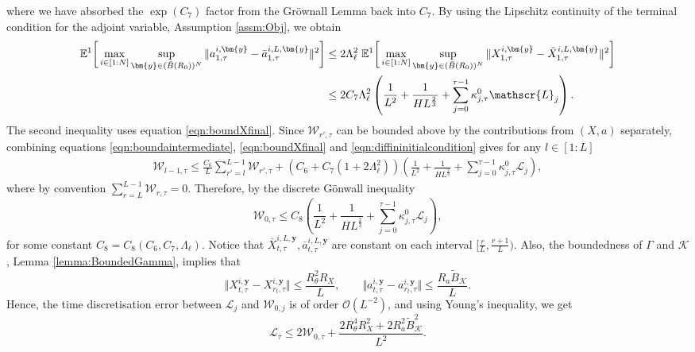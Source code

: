 \documentclass{article}
\begin{document}
\begin{appendices}
\begin{equation}
\end{equation}
where we have absorbed the $\exp(C_7)$ factor from the Gr\"ownall Lemma back into $C_7$. By using the Lipschitz continuity of the terminal condition for the adjoint variable, Assumption \ref{assm:Obj}, we obtain
\begin{align}\label{eqn:diffininitialcondition}
\mathbb E^1 \bigg[\max_{i\in[1:N]}\sup_{\bm{y}\in (\bar B(R_0))^N} \Vert a^{i,\bm{y}}_{1,\tau} - \bar a^{i,L,\bm{y}}_{1,\tau}\Vert^2 \bigg] &\le 2\Lambda_\ell^2\;\mathbb E^1 \bigg[\max_{i\in[1:N]} \sup_{\bm{y}\in (\bar B(R_0))^N}\Vert X^{i,\bm{y}}_{1,\tau} - \bar X^{i,L,\bm{y}}_{1,\tau}\Vert^2 \bigg]\notag\\&\le 2C_7 \Lambda_\ell^2\left(\frac{1}{L^2}+\frac{1}{HL^{\frac{2}{3}}}+\sum_{j=0}^{\tau-1}\kappa^0_{j,\tau}\mathscr{L}_j\right) .
\end{align}
The second inequality uses equation \eqref{eqn:boundXfinal}.
Since $\mathscr{W}_{r',\tau}$ can be bounded above by the contributions from $(X,a)$ separately, combining equations \eqref{eqn:boundaintermediate}, \eqref{eqn:boundXfinal} and \eqref{eqn:diffininitialcondition} gives for any $l\in[1:L]$
\begin{align*}
\mathscr{W}_{l-1,\tau}\le \frac{C_6}{L}\sum_{r'=l}^{L-1} \mathscr{W}_{r',\tau}+(C_6+C_7(1+2\Lambda_\ell^2))\left(\frac{1}{L^2}+\frac{1}{HL^{\frac{2}{3}}}+\sum_{j=0}^{\tau-1}\kappa^0_{j,\tau}\mathscr{L}_j\right),
\end{align*}
where by convention $ \sum_{r=L}^{L-1}\mathscr{W}_{r,\tau}=0$. 
Therefore, by the discrete G\"onwall inequality
\begin{equation}\label{eqn:boundmathscrW}
    \mathscr{W}_{0,\tau}\le C_8\left(\frac{1}{L^2}+\frac{1}{HL^{\frac{2}{3}}}+\sum_{j=0}^{\tau-1}\kappa^0_{j,\tau}\mathscr{L}_j\right),
\end{equation}
for some constant $C_8=C_8(C_6,C_7,\Lambda_\ell)$.
Notice that $\bar X^{i,L,\bm{y}}_{t,\tau}, \bar a^{i,L,\bm{y}}_{t,\tau}$ are constant on each interval $[\frac{r}{L},\frac{r+1}{L})$. Also, the boundedness of $\Gamma$ and $\mathcal K$, Lemma \ref{lemma:BoundedGamma}, implies that $$\Vert X^{i,\bm{y}}_{t,\tau}-X^{i,\bm{y}}_{r_t,\tau}\Vert\le \frac{R_\theta^2R_X}{L},\qquad \Vert a^{i,\bm{y}}_{t,\tau}- a^{i,\bm{y}}_{r_t,\tau}\Vert \le \frac{ R_a\tilde{B}_\mathcal{K}}{L}. $$ Hence, the time discretisation error between $\mathscr{L}_j$ and $\mathscr{W}_{0,j}$ is of order $\mathcal O(L^{-2})$, and using Young's inequality, we get
\[
\mathscr{L}_\tau\le 2\mathscr{W}_{0,\tau}+ \frac{2 R_\theta^4R_X^2+2R_a^2\tilde{B}_\mathcal{K}^2}{L^2}.
\]
\end{appendices}
\end{document}
